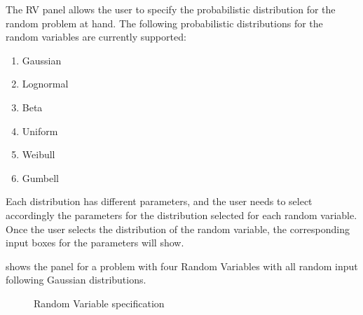 The RV panel allows the user to specify the probabilistic distribution for the random problem at hand. The following probabilistic distributions for the random variables are currently supported: 
\begin{enumerate}
\item Gaussian
\item Lognormal
\item Beta
\item Uniform
\item Weibull
\item Gumbell
\end{enumerate}

Each distribution has different parameters, and the user needs to select accordingly the parameters for the distribution selected for each random variable. Once the user selects the distribution of the random variable, the
corresponding input boxes for the parameters will show. 

 shows the panel for a problem with four Random Variables with all random input following Gaussian distributions. 

\begin{figure}[!htbp]
  \caption{Random Variable specification}
  \label{fig:rv}
\end{figure}


